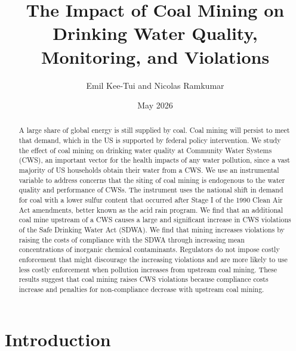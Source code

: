 \documentclass{article}
\begin{document}
\title{The Impact of Coal Mining on Drinking Water Quality, Monitoring, and Violations}
\author[1]{Emil Kee-Tui and Nicolas Ramkumar}
\date{May 2026}
\maketitle
\thispagestyle{empty}
\doublespacing

\begin{center}\begin{abstract}
		\noindent A large share of global energy is still supplied by coal. Coal mining will persist to meet that demand, which in the US is supported by federal policy intervention. We study the effect of coal mining on drinking water quality at Community Water Systems (CWS), an important vector for the health impacts of any water pollution, since a vast majority of US households obtain their water from a CWS. We use an instrumental variable to address concerns that the siting of coal mining is endogenous to the water quality and performance of CWSs. The instrument uses the national shift in demand for coal with a lower sulfur content that occurred after Stage I of the 1990 Clean Air Act amendments, better known as the acid rain program. We find that an additional coal mine upstream of a CWS causes a large and significant increase in CWS violations of the Safe Drinking Water Act (SDWA). We find that mining increases violations by raising the costs of compliance with the SDWA through increasing mean concentrations of inorganic chemical contaminants. Regulators do not impose costly enforcement that might discourage the increasing violations and are more likely to use less costly enforcement when pollution increases from upstream coal mining. These results suggest that coal mining raises CWS violations because compliance costs increase and penalties for non-compliance decrease with upstream coal mining.

\end{abstract}\end{center}
	
\newpage
\doublespacing


\section{Introduction}
\end{document}
